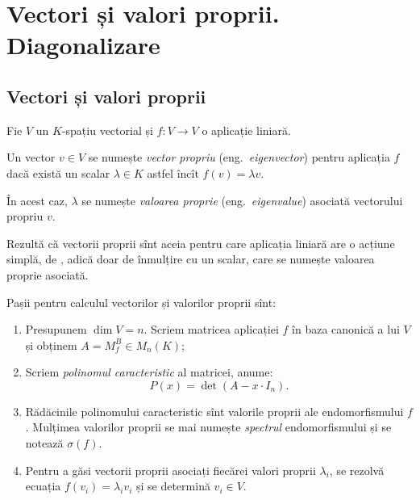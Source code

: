 \chapter{Vectori și valori proprii. Diagonalizare}

\section{Vectori și valori proprii}

Fie $ V $ un $ K $-spațiu vectorial și $ f : V \to V $ o aplicație
liniară.
\begin{definition}\label{def:vvp}  
  Un vector $ v \in V $ se numește \emph{vector propriu} (eng.\ \emph{eigenvector})
  pentru aplicația $ f $ dacă există un scalar $ \lambda \in K $ astfel încît
  $ f(v) = \lambda v $.

  În acest caz, $ \lambda $ se numește \emph{valoarea proprie} (eng.\ \emph{eigenvalue})
  asociată vectorului propriu $ v $.
\end{definition}

Rezultă că vectorii proprii sînt aceia pentru care aplicația liniară
are o acțiune simplă, de , adică doar de înmulțire cu un scalar,
care se numește valoarea proprie asociată.

Pașii pentru calculul vectorilor și valorilor proprii sînt:
\begin{enumerate}[(1)]
\item Presupunem $ \dim V = n $. Scriem matricea aplicației $ f $ în baza
  canonică a lui $ V $ și obținem $ A = M_f^B \in M_n(K) $;
\item Scriem \emph{polinomul caracteristic} al matricei, anume:
  \[
    P(x) = \det(A - x \cdot I_n).
  \]
\item Rădăcinile polinomului caracteristic sînt valorile proprii ale
  endomorfismului $ f $. Mulțimea valorilor proprii se mai numește \emph{spectrul}
  endomorfismului și se notează $ \sigma(f) $. 
\item Pentru a găsi vectorii proprii asociați fiecărei valori proprii $ \lambda_i $,
  se rezolvă ecuația $ f(v_i) = \lambda_i v_i $ și se determină $ v_i \in V $.
\end{enumerate}

